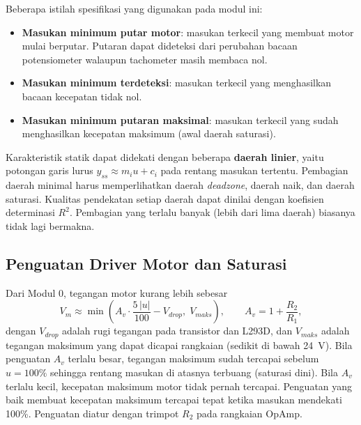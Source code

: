 \documentclass[11pt,a4paper]{article}
\begin{document}
Beberapa istilah spesifikasi yang digunakan pada modul ini:
\begin{itemize}
	\item \textbf{Masukan minimum putar motor}: masukan terkecil yang membuat motor mulai berputar. Putaran dapat dideteksi dari perubahan bacaan potensiometer walaupun tachometer masih membaca nol.
	\item \textbf{Masukan minimum terdeteksi}: masukan terkecil yang menghasilkan bacaan kecepatan tidak nol.
	\item \textbf{Masukan minimum putaran maksimal}: masukan terkecil yang sudah menghasilkan kecepatan maksimum (awal daerah saturasi).
\end{itemize}

Karakteristik statik dapat didekati dengan beberapa \textbf{daerah linier}, yaitu potongan garis lurus $y_{ss} \approx m_i u + c_i$ pada rentang masukan tertentu. Pembagian daerah minimal harus memperlihatkan daerah \textit{deadzone}, daerah naik, dan daerah saturasi. Kualitas pendekatan setiap daerah dapat dinilai dengan koefisien determinasi $R^2$. Pembagian yang terlalu banyak (lebih dari lima daerah) biasanya tidak lagi bermakna.

\subsection{Penguatan Driver Motor dan Saturasi}
Dari Modul 0, tegangan motor kurang lebih sebesar
\begin{equation}
	V_m \approx \min\!\left(A_v \cdot \frac{5\,|u|}{100} - V_{drop},\; V_{maks}\right),
	\qquad A_v = 1 + \frac{R_2}{R_1},
	\label{eq:vm}
\end{equation}
dengan $V_{drop}$ adalah rugi tegangan pada transistor dan L293D, dan $V_{maks}$ adalah tegangan maksimum yang dapat dicapai rangkaian (sedikit di bawah 24~V). Bila penguatan $A_v$ terlalu besar, tegangan maksimum sudah tercapai sebelum $u = 100\%$ sehingga rentang masukan di atasnya terbuang (saturasi dini). Bila $A_v$ terlalu kecil, kecepatan maksimum motor tidak pernah tercapai. Penguatan yang baik membuat kecepatan maksimum tercapai tepat ketika masukan mendekati 100\%. Penguatan diatur dengan trimpot $R_2$ pada rangkaian OpAmp.
\end{document}
